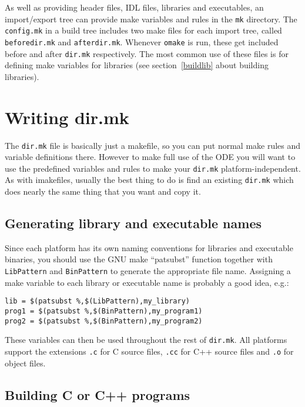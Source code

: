 \documentclass[11pt,twoside,onecolumn]{article}
\begin{document}
As well as providing header files, IDL files, libraries and executables, an
import/export tree can provide make variables and rules in the {\tt mk}
directory.  The {\tt config.mk} in a build tree includes two make files for
each import tree, called {\tt beforedir.mk} and {\tt afterdir.mk}.  Whenever
{\tt omake} is run, these get included before and after {\tt dir.mk}
respectively.  The most common use of these files is for defining make
variables for libraries (see section~\ref{buildlib} about building libraries).


\section{Writing dir.mk}

The {\tt dir.mk} file is basically just a makefile, so you can put normal make
rules and variable definitions there.  However to make full use of the ODE you
will want to use the predefined variables and rules to make your {\tt dir.mk}
platform-independent.  As with imakefiles, usually the best thing to do is find
an existing {\tt dir.mk} which does nearly the same thing that you want and
copy it.

\subsection{Generating library and executable names}

Since each platform has its own naming conventions for libraries and executable
binaries, you should use the GNU make ``patsubst'' function together with {\tt
LibPattern} and {\tt BinPattern} to generate the appropriate file name.
Assigning a make variable to each library or executable name is probably a good
idea, e.g.:

{\footnotesize \begin{verbatim}
lib = $(patsubst %,$(LibPattern),my_library)
prog1 = $(patsubst %,$(BinPattern),my_program1)
prog2 = $(patsubst %,$(BinPattern),my_program2)
\end{verbatim}}

These variables can then be used throughout the rest of {\tt dir.mk}.  All
platforms support the extensions {\tt .c} for C source files, {\tt .cc} for C++
source files and {\tt .o} for object files.

\subsection{Building C or C++ programs}
\end{document}
